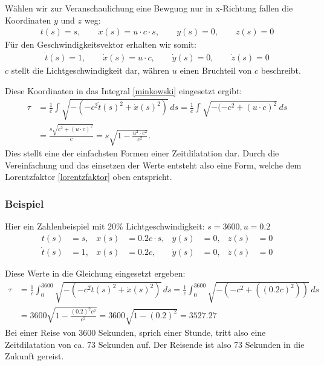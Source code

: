 \begin{refsection}
Wählen wir zur Veranschaulichung eine Bewgung nur in x-Richtung fallen die Koordinaten $y$ und $z$  weg:
\begin{align*}
     t(s)= s,
 	 \qquad x(s)=u\cdot c \cdot s,
     \qquad y(s)=0,
     \qquad z(s)=0 
\end{align*}
Für den Geschwindigkeitsvektor erhalten wir somit:
\begin{align*}
     \dot{t}(s)=1,
     \qquad\dot{x}(s)=u\cdot c,
     \qquad\dot{y}(s)=0,
     \qquad\dot{z}(s)=0
\end{align*}
$c$ stellt die Lichtgeschwindigkeit dar, währen $u$ einen Bruchteil von $c$ beschreibt.

Diese Koordinaten in das Integral \ref{minkowski} eingesetzt ergibt:
\begin{align*}
\tau
&=
\frac{1}{c}\int_{}^{}\sqrt{-(-c^2\dot{t}(s)^2+\dot{x}(s)^2)}\,ds 
=
\frac{1}{c}\int_{}^{}\sqrt{-(-c^2 +(u\cdot c)^{2}}\,ds\\
&=
\frac{s\sqrt{c^2+(u\cdot c)^{2}}}{c} 
=
s\sqrt{1-\frac{u^2\cdot c^2}{c^2}}.
\end{align*}
Dies stellt eine der einfachsten Formen einer Zeitdilatation dar. Durch die Vereinfachung und das einsetzen der Werte entsteht also eine Form, welche dem Lorentzfaktor \eqref{lorentzfaktor} oben entspricht.

\subsubsection{Beispiel}
Hier ein Zahlenbeispiel mit 20\% Lichtgeschwindigkeit:
$s=3600, u=0.2$ 
\[
\begin{aligned}
t(s)&=s, & x(s)&=0.2c \cdot s, & y(s)&=0, & z(s)&=0 \\
\dot{t}(s)&=1, & \dot{x}(s)&=0.2c, & \dot{y}(s)&=0, & \dot{z}(s)&=0
\end{aligned}
\]

Diese Werte in die Gleichung eingesetzt ergeben:
\begin{align*}
 \tau
&=
\frac{1}{c}\int_{0}^{3600}\sqrt{-(-c^2\dot{t}(s)^2+\dot{x}(s)^2)}\,ds
=
\frac{1}{c}\int_{0}^{3600}\sqrt{-(-c^2+((0.2c)^2))}\,ds\\
&=
3600\sqrt{1-\frac{(0.2)^2 c^2}{c^2}} 
=
3600\sqrt{1-(0.2)^2}
=
3527.27
\end{align*}
Bei einer Reise von 3600 Sekunden, sprich einer Stunde, tritt also eine Zeitdilatation von ca. 73 Sekunden auf. Der Reisende ist also 73 Sekunden in die Zukunft gereist.


\end{refsection}
